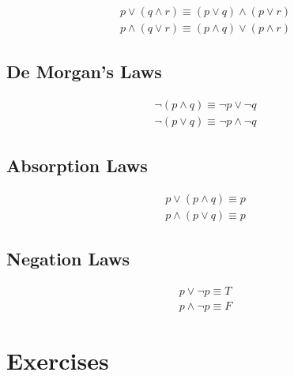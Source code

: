 \documentclass[12pt letter]{report}
\begin{document}
\begin{align*}
	p \vee \left( q \wedge r \right) \equiv \left( p \vee q \right)  \wedge \left( p \vee r \right) \\
	p \wedge \left( q \vee r  \right)  \equiv \left( p \wedge q  \right) \vee \left( p \wedge r \right)
\end{align*}

\subsection{De Morgan's Laws}

\begin{align*}
	\neg \left( p \wedge q \right) \equiv \neg p \vee \neg  q \\
	\neg \left( p \vee q  \right) \equiv \neg p \wedge \neg q
\end{align*}

\subsection{Absorption Laws}

\begin{align*}
	p \vee \left( p \wedge q  \right)  \equiv p \\
	p \wedge \left( p \vee q  \right) \equiv p
\end{align*}

\subsection{Negation Laws}

\begin{align*}
	p \vee \neg p \equiv T \\
	p \wedge \neg p \equiv F
\end{align*}

\section{Exercises}
\end{document}
